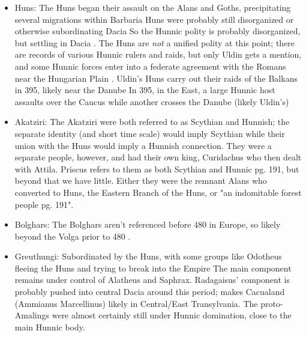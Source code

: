 \documentclass{article}
\begin{document}
	\begin{itemize}
		\item Huns:\newline
		The Huns began their assault on the Alans and Goths, precipitating several migrations within Barbaria
		Huns were probably still disorganized or otherwise subordinating Dacia
		So the Hunnic polity is probably disorganized, but settling in Dacia \cite{OttoHuns}.
		The Huns are \textit{not} a unified polity at this point; there are records of various Hunnic rulers and raids, but only Uldin gets a mention, and some Hunnic forces enter into a federate agreement with the Romans near the Hungarian Plain \cite{OttoHuns}.
		Uldin's Huns carry out their raids of the Balkans in 395, likely near the Danube
		In 395, in the East, a large Hunnic host assaults over the Caucus while another crosses the Danube (likely Uldin's)
		
		\item Akatziri:\newline
		The Akatziri were both referred to as Scythian and Hunnish; the separate identity (and short time scale) would imply Scythian while their union with the Huns would imply a Hunnish connection.
		They were a separate people, however, and had their own king, Curidachus \cite{PLRE_Vol2} who then dealt with Attila. 
		Priscus refers to them as both Scythian and Hunnic \cite{CambridgeHistoryEarlyInnerAsia_Akatziri}\tiny pg. 191\normalsize, but beyond that we have little.
		Either they were the remnant Alans who converted to Huns, the Eastern Branch of the Huns, or "an indomitable forest people \cite{CambridgeHistoryEarlyInnerAsia_Akatziri} \tiny pg. 191\normalsize".
		
		\item Bolghars:\newline
		The Bolghars aren't referenced before 480 in Europe, so likely beyond the Volga prior to 480 \cite{KimHuns}.
		
		\item Greuthungi:\newline
		Subordinated by the Huns, with some groups like Odotheus fleeing the Huns and trying to break into the Empire
		The main component remains under control of Alatheus and Saphrax.
		Radagaisus' component is probably pushed into central Dacia around this period; makes Cacualand (Ammianus Marcellinus) likely in Central/East Transylvania.
		The proto-Amalings were almost certainly still under Hunnic domination, close to the main Hunnic body.
		

\end{itemize}
\end{document}
